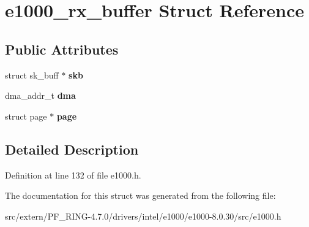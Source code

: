 \hypertarget{structe1000__rx__buffer}{
\section{e1000\_\-rx\_\-buffer Struct Reference}
\label{structe1000__rx__buffer}
}
\subsection*{Public Attributes}
\begin{DoxyCompactItemize}
\item 
\hypertarget{structe1000__rx__buffer_ab1c6743e567929302d65ce40f9ba45bc}{
struct sk\_\-buff $\ast$ {\bfseries skb}}
\label{structe1000__rx__buffer_ab1c6743e567929302d65ce40f9ba45bc}

\item 
\hypertarget{structe1000__rx__buffer_a8c1b67b466539d3aa76e8b886e8c3481}{
dma\_\-addr\_\-t {\bfseries dma}}
\label{structe1000__rx__buffer_a8c1b67b466539d3aa76e8b886e8c3481}

\item 
\hypertarget{structe1000__rx__buffer_acd5da557db969dd1a6adf09fd07daee7}{
struct page $\ast$ {\bfseries page}}
\label{structe1000__rx__buffer_acd5da557db969dd1a6adf09fd07daee7}

\end{DoxyCompactItemize}


\subsection{Detailed Description}


Definition at line 132 of file e1000.h.



The documentation for this struct was generated from the following file:\begin{DoxyCompactItemize}
\item 
src/extern/PF\_\-RING-\/4.7.0/drivers/intel/e1000/e1000-\/8.0.30/src/e1000.h\end{DoxyCompactItemize}
